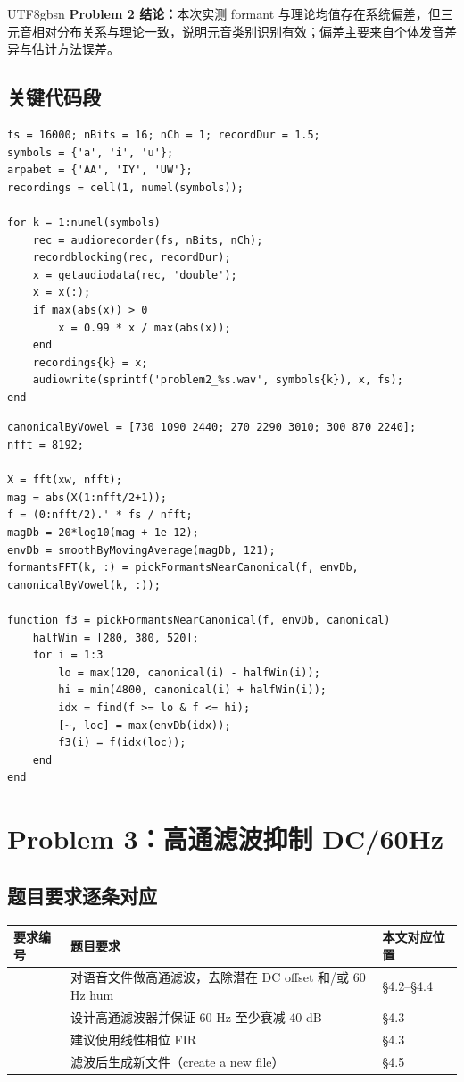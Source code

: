 \documentclass[12pt,a4paper]{article}
\begin{document}
\begin{CJK*}{UTF8}{gbsn}
\textbf{Problem 2 结论：}本次实测 formant 与理论均值存在系统偏差，但三元音相对分布关系与理论一致，说明元音类别识别有效；偏差主要来自个体发音差异与估计方法误差。

\subsection{关键代码段}
\begin{lstlisting}[caption={Problem 2 元音录制与保存}]
fs = 16000; nBits = 16; nCh = 1; recordDur = 1.5;
symbols = {'a', 'i', 'u'};
arpabet = {'AA', 'IY', 'UW'};
recordings = cell(1, numel(symbols));

for k = 1:numel(symbols)
    rec = audiorecorder(fs, nBits, nCh);
    recordblocking(rec, recordDur);
    x = getaudiodata(rec, 'double');
    x = x(:);
    if max(abs(x)) > 0
        x = 0.99 * x / max(abs(x));
    end
    recordings{k} = x;
    audiowrite(sprintf('problem2_%s.wav', symbols{k}), x, fs);
end
\end{lstlisting}

\begin{lstlisting}[caption={Problem 2 按标准邻域搜索 Formant 并标注}]
canonicalByVowel = [730 1090 2440; 270 2290 3010; 300 870 2240];
nfft = 8192;

X = fft(xw, nfft);
mag = abs(X(1:nfft/2+1));
f = (0:nfft/2).' * fs / nfft;
magDb = 20*log10(mag + 1e-12);
envDb = smoothByMovingAverage(magDb, 121);
formantsFFT(k, :) = pickFormantsNearCanonical(f, envDb, canonicalByVowel(k, :));

function f3 = pickFormantsNearCanonical(f, envDb, canonical)
    halfWin = [280, 380, 520];
    for i = 1:3
        lo = max(120, canonical(i) - halfWin(i));
        hi = min(4800, canonical(i) + halfWin(i));
        idx = find(f >= lo & f <= hi);
        [~, loc] = max(envDb(idx));
        f3(i) = f(idx(loc));
    end
end
\end{lstlisting}

\section{Problem 3：高通滤波抑制 DC/60Hz}

\subsection{题目要求逐条对应}
\begin{table}[H]
\centering
\begin{tabular}{>{\centering\arraybackslash}p{1.3cm}p{9.8cm}p{3.2cm}}
\toprule
要求编号 & 题目要求 & 本文对应位置 \\
\midrule
1 & 对语音文件做高通滤波，去除潜在 DC offset 和/或 60 Hz hum & \S4.2--\S4.4 \\
2 & 设计高通滤波器并保证 60 Hz 至少衰减 40 dB & \S4.3 \\
3 & 建议使用线性相位 FIR & \S4.3 \\
4 & 滤波后生成新文件（create a new file） & \S4.5 \\
\bottomrule
\end{tabular}
\end{table}


\end{CJK*}
\end{document}

